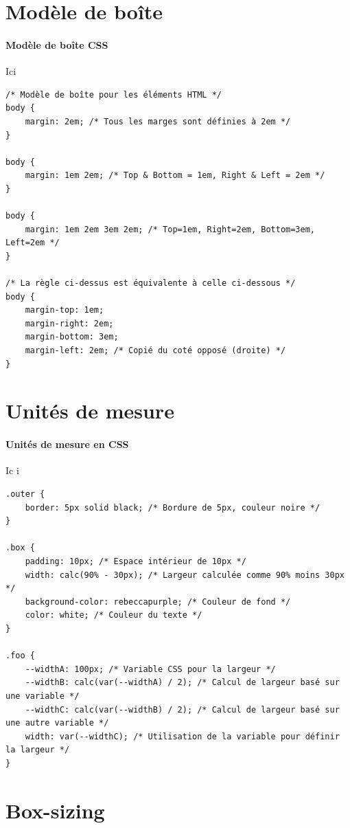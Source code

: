 \documentclass{report}
\begin{document}
\begin{multicols*}{2}
\section{Modèle de boîte}
\paragraph{Modèle de boîte CSS} Ici

\begin{lstlisting}[style=CSSDraculaLight]
/* Modèle de boîte pour les éléments HTML */
body { 
    margin: 2em; /* Tous les marges sont définies à 2em */
}

body { 
    margin: 1em 2em; /* Top & Bottom = 1em, Right & Left = 2em */
}

body { 
    margin: 1em 2em 3em 2em; /* Top=1em, Right=2em, Bottom=3em, Left=2em */
}

/* La règle ci-dessus est équivalente à celle ci-dessous */
body {
    margin-top: 1em;
    margin-right: 2em;
    margin-bottom: 3em;
    margin-left: 2em; /* Copié du coté opposé (droite) */
}
\end{lstlisting}

\section{Unités de mesure}
\paragraph{Unités de mesure en CSS} Ic i

\begin{lstlisting}[style=CSSDraculaLight]
.outer {
    border: 5px solid black; /* Bordure de 5px, couleur noire */
}

.box {
    padding: 10px; /* Espace intérieur de 10px */
    width: calc(90% - 30px); /* Largeur calculée comme 90% moins 30px */
    background-color: rebeccapurple; /* Couleur de fond */
    color: white; /* Couleur du texte */
}

.foo {
    --widthA: 100px; /* Variable CSS pour la largeur */
    --widthB: calc(var(--widthA) / 2); /* Calcul de largeur basé sur une variable */
    --widthC: calc(var(--widthB) / 2); /* Calcul de largeur basé sur une autre variable */
    width: var(--widthC); /* Utilisation de la variable pour définir la largeur */
}
\end{lstlisting}


\section{Box-sizing}

\end{multicols*}
\end{document}
